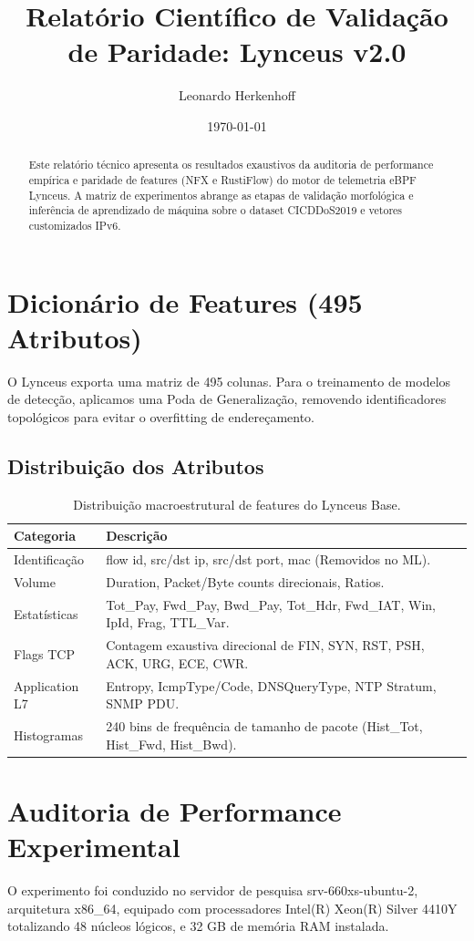 \documentclass[11pt,a4paper]{article}
\title{Relatório Científico de Validação de Paridade: Lynceus v2.0}
\author{Leonardo Herkenhoff}
\date{\today}
\begin{document}
\maketitle

\begin{abstract}
Este relatório técnico apresenta os resultados exaustivos da auditoria de performance empírica e paridade de features (NFX e RustiFlow) do motor de telemetria eBPF Lynceus. A matriz de experimentos abrange as etapas de validação morfológica e inferência de aprendizado de máquina sobre o dataset CICDDoS2019 e vetores customizados IPv6.
\end{abstract}

\section{Dicionário de Features (495 Atributos)}
O Lynceus exporta uma matriz de 495 colunas. Para o treinamento de modelos de detecção, aplicamos uma Poda de Generalização, removendo identificadores topológicos para evitar o overfitting de endereçamento.

\subsection{Distribuição dos Atributos}
\begin{table}[H]
\centering
\begin{tabular}{ll}
\toprule
\textbf{Categoria} & \textbf{Descrição} \\
\midrule
Identificação & flow id, src/dst ip, src/dst port, mac (Removidos no ML). \\
Volume & Duration, Packet/Byte counts direcionais, Ratios. \\
Estatísticas & Tot\_Pay, Fwd\_Pay, Bwd\_Pay, Tot\_Hdr, Fwd\_IAT, Win, IpId, Frag, TTL\_Var. \\
Flags TCP & Contagem exaustiva direcional de FIN, SYN, RST, PSH, ACK, URG, ECE, CWR. \\
Application L7 & Entropy, IcmpType/Code, DNSQueryType, NTP Stratum, SNMP PDU. \\
Histogramas & 240 bins de frequência de tamanho de pacote (Hist\_Tot, Hist\_Fwd, Hist\_Bwd). \\
\bottomrule
\end{tabular}
\caption{Distribuição macroestrutural de features do Lynceus Base.}
\end{table}

\section{Auditoria de Performance Experimental}
O experimento foi conduzido no servidor de pesquisa srv-660xs-ubuntu-2, arquitetura x86\_64, equipado com processadores Intel(R) Xeon(R) Silver 4410Y totalizando 48 núcleos lógicos, e 32 GB de memória RAM instalada.
\end{document}
